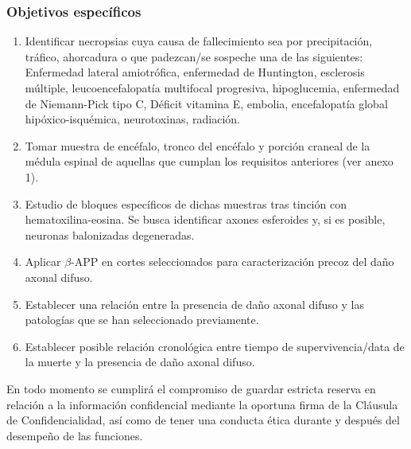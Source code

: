 \subsubsection{Objetivos específicos}
\begin{enumerate}
	\item Identificar necropsias cuya causa de fallecimiento sea por precipitación, tráfico, ahorcadura o que padezcan/se sospeche una de las siguientes: Enfermedad lateral amiotrófica, enfermedad de Huntington, esclerosis múltiple, leucoencefalopatía multifocal progresiva, hipoglucemia, enfermedad de Niemann-Pick tipo C, Déficit vitamina E, embolia, encefalopatía global hipóxico-isquémica, neurotoxinas, radiación.   
	\item Tomar muestra de encéfalo, tronco del encéfalo y porción craneal de la médula espinal de aquellas que cumplan los requisitos anteriores (ver anexo 1).
	\item Estudio de bloques específicos de dichas muestras tras tinción con hematoxilina-eosina. Se busca identificar axones esferoides y, si es posible, neuronas balonizadas degeneradas.
	\item Aplicar $\beta$-APP en cortes seleccionados para caracterización precoz del daño axonal difuso. 
	\item Establecer una relación entre la presencia de daño axonal difuso y las patologías que se han seleccionado previamente.
	\item Establecer posible relación cronológica entre tiempo de supervivencia/data de la muerte y la presencia de daño axonal difuso. 
	
\end{enumerate}
    En todo momento se cumplirá el compromiso de guardar estricta reserva en relación a la información confidencial mediante la oportuna firma de la Cláusula de Confidencialidad, así como de tener una conducta ética durante y después del desempeño de las funciones.
